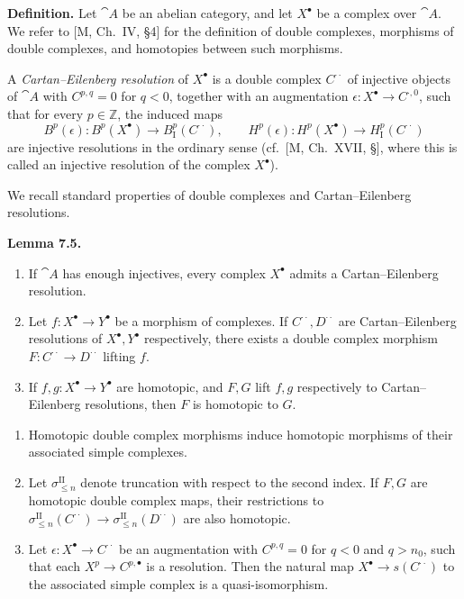 \setcounter{page}{76}
\textbf{Definition.}
Let \(\cat{A}\) be an abelian category, and let \(X^\bullet\) be a complex over \(\cat{A}\).
We refer to [M, Ch.\ IV, \S4] for the definition of double complexes, morphisms of double complexes, and homotopies between such morphisms.

A \textit{Cartan--Eilenberg resolution} of \(X^\bullet\) is a double complex \(C^{\cdot\cdot}\) of injective objects of \(\cat{A}\) with \(C^{p,q}=0\) for \(q<0\), together with an augmentation
\(\epsilon\colon X^\bullet\to C^{\cdot,0}\), such that for every \(p\in\mathbb{Z}\), the induced maps
\[
B^p(\epsilon)\colon B^p(X^\bullet)\to B_\mathrm{I}^p(C^{\cdot\cdot}),\qquad
H^p(\epsilon)\colon H^p(X^\bullet)\to H_\mathrm{I}^p(C^{\cdot\cdot})
\]
are injective resolutions in the ordinary sense (cf.\ [M, Ch.\ XVII, \S], where this is called an injective resolution of the complex \(X^\bullet\)).

We recall standard properties of double complexes and Cartan--Eilenberg resolutions.

\textbf{Lemma 7.5.}
\begin{enumerate}
\item[(a)] If \(\cat{A}\) has enough injectives, every complex \(X^\bullet\) admits a Cartan--Eilenberg resolution.
\item[(b)] Let \(f\colon X^\bullet\to Y^\bullet\) be a morphism of complexes. If \(C^{\cdot\cdot},D^{\cdot\cdot}\) are Cartan--Eilenberg resolutions of \(X^\bullet,Y^\bullet\) respectively, there exists a double complex morphism \(F\colon C^{\cdot\cdot}\to D^{\cdot\cdot}\) lifting \(f\).
\item[(c)] If \(f,g\colon X^\bullet\to Y^\bullet\) are homotopic, and \(F,G\) lift \(f,g\) respectively to Cartan--Eilenberg resolutions, then \(F\) is homotopic to \(G\).
\end{enumerate}

\setcounter{page}{77}
\begin{enumerate}
\item[(d)] Homotopic double complex morphisms induce homotopic morphisms of their associated simple complexes.
\item[(e)] Let \(\sigma_{\le n}^\mathrm{II}\) denote truncation with respect to the second index. If \(F,G\) are homotopic double complex maps, their restrictions to \(\sigma_{\le n}^\mathrm{II}(C^{\cdot\cdot})\to\sigma_{\le n}^\mathrm{II}(D^{\cdot\cdot})\) are also homotopic.
\item[(f)] Let \(\epsilon\colon X^\bullet\to C^{\cdot\cdot}\) be an augmentation with \(C^{p,q}=0\) for \(q<0\) and \(q>n_0\), such that each \(X^p\to C^{p,\bullet}\) is a resolution. Then the natural map \(X^\bullet\to s(C^{\cdot\cdot})\) to the associated simple complex is a quasi-isomorphism.
\end{enumerate}

